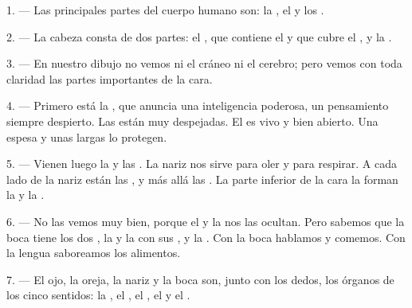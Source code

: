 
\VUsaut{4.0mm}
\VUsaut{2.0mm}

\VUsaut{2.4mm}
\VUsaut{3.0mm}

1. --- Las principales partes del cuerpo humano son: la , el
 y los .

\VUsaut{3.0mm}

2. --- La cabeza consta de dos partes: el , que contiene el
 y que cubre el , y la .

3. --- En nuestro dibujo no vemos ni el cráneo ni el cerebro; pero vemos
con toda claridad las partes importantes de la cara.

4. --- Primero está la , que anuncia una inteligencia
poderosa, un pensamiento siempre despierto. Las  están muy
despejadas. El  es vivo y bien abierto. Una  espesa
y unas  largas lo protegen.

5. --- Vienen luego la  y las .
La nariz nos sirve para oler y para respirar. A cada lado de la nariz
están las , y más allá las . La parte
inferior de la cara la forman la  y la .

6. --- No las vemos muy bien, porque el  y la 
nos las ocultan. Pero sabemos que la boca tiene los dos , la
 y la  con sus
, y la . Con la boca hablamos y comemos. Con
la lengua saboreamos los alimentos.

7. --- El ojo, la oreja, la nariz y la boca son, junto con los dedos, los
órganos de los cinco sentidos: la , el , el
, el  y el .

